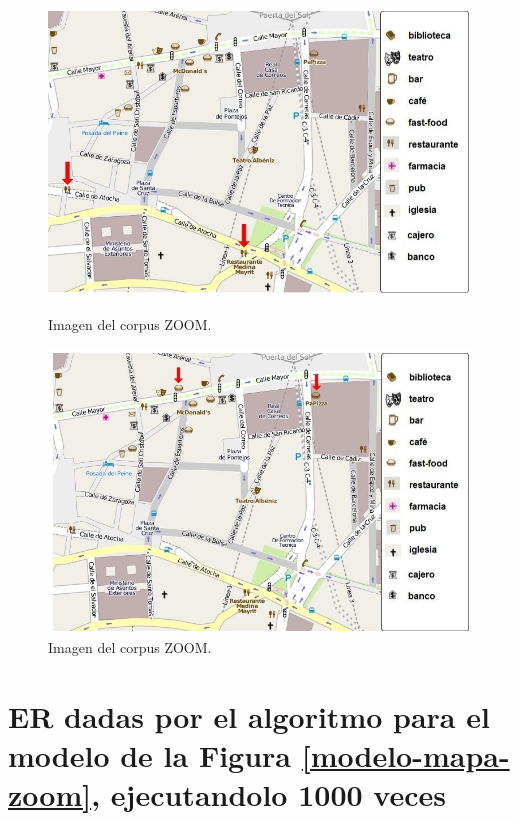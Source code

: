 \begin{figure}
\begin{minipage}[b]{0.5\linewidth}
\centering
\includegraphics[width=\textwidth]{images/corpus/mapa11.png}
\caption{Imagen del corpus ZOOM.}
\label{mapa11}
\end{minipage}
\hspace*{0cm}
\begin{minipage}[b]{0.5\linewidth}
\centering
\includegraphics[width=\textwidth]{images/corpus/mapa12.png}
\caption{Imagen del corpus ZOOM.}
\label{mapa12}
\end{minipage}
\end{figure}


\chapter{ER dadas por el algoritmo para el modelo de la Figura \ref{modelo-mapa-zoom}, ejecutandolo 1000 veces}
\label{er-mapa-zoom}

